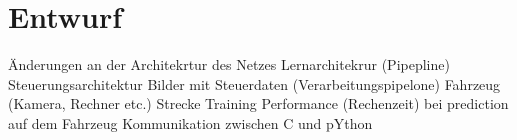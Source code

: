 %
\chapter{Entwurf}


Änderungen an der Architekrtur des Netzes
Lernarchitekrur (Pipepline)
Steuerungsarchitektur
Bilder mit Steuerdaten (Verarbeitungspipelone)
Fahrzeug (Kamera, Rechner etc.)
Strecke 
Training 
Performance (Rechenzeit) bei prediction auf dem Fahrzeug
Kommunikation zwischen C und pYthon